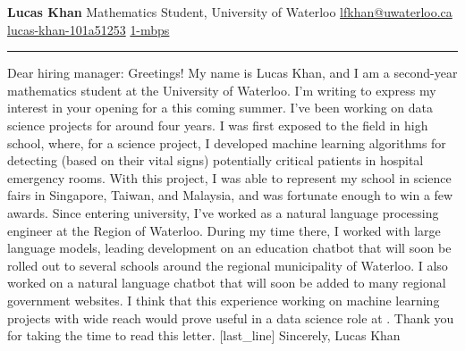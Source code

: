 \documentclass[12pt]{article}
\newcommand{\contact}[3]{{#1} \hspace{0.05em} \href{#2}{#3} \newline}
\newcommand{\companyname}{}
\newcommand{\position}{}
\begin{document}
\noindent\begin{minipage}[t]{0.3\textwidth}
  \vspace{0pt}
  \begin{flushleft}
      {\LARGE \textbf{Lucas Khan}} \newline
      {\large Mathematics Student, University of Waterloo} \newline \newline
      \contact{\faEnvelopeSquare}{mailto:lfkhan@uwaterloo.ca}{lfkhan@uwaterloo.ca}
      \contact{\faLinkedinSquare}{https://linkedin.com/in/lucas-khan-101a51253}{lucas-khan-101a51253}
      \contact{\faGithubSquare}{https://github.com/1-mbps}{1-mbps}
  \end{flushleft}
\end{minipage}%
\hspace{0.07\textwidth}%
\begin{minipage}[t]{0.63\textwidth}
  \vspace{0pt}
  \rule{\linewidth}{3px} %
  \newline \newline
  Dear hiring manager:
  \newline \newline
  Greetings! My name is Lucas Khan, and I am a second-year mathematics student at the University of Waterloo. I’m writing to express my interest in your opening for a \position this coming summer.
  \newline \newline
  I've been working on data science projects for around four years. I was first exposed to the field in high school, where, for a science project, I developed machine learning algorithms for detecting (based on their vital signs) potentially critical patients in hospital emergency rooms. With this project, I was able to represent my school in science fairs in Singapore, Taiwan, and Malaysia, and was fortunate enough to win a few awards.
  \newline \newline
  Since entering university, I've worked as a natural language processing engineer at the Region of Waterloo. During my time there, I worked with large language models, leading development on an education chatbot that will soon be rolled out to several schools around the regional municipality of Waterloo. I also worked on a natural language chatbot that will soon be added to many regional government websites. I think that this experience working on machine learning projects with wide reach would prove useful in a data science role at \companyname.
  \newline \newline
  Thank you for taking the time to read this letter. [last_line]
  \newline \newline
  Sincerely,
  \newline \newline \newline
  Lucas Khan
\end{minipage}
\end{document}
